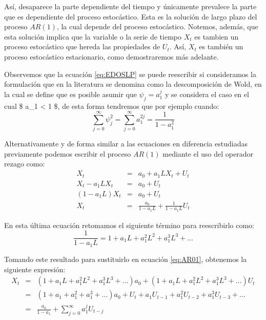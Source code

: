 \documentclass[
]{book}
\begin{document}
Así, desaparece la parte dependiente del tiempo y únicamente prevalece la parte que es dependiente del proceso estocástico. Esta es la solución de largo plazo del proceso \(AR(1)\), la cual depende del proceso estocástico. Notemos, además, que esta solución implica que la variable o la serie de tiempo \(X_t\) es tambien un proceso estocástico que hereda las propiedades de \(U_t\). Así, \(X_t\) es también un proceso estocástico estacionario, como demostraremos más adelante.

Observemos que la ecuación \eqref{eq:EDOSLP} se puede reescribir si consideramos la formulación que en la literatura se denomina como la descomposición de Wold, en la cual se define que es posible asumir que \(\psi_j = a_1^j\) y se considera el caso en el cual \$ \textbar a\_1\textbar{} \textless{} 1 \$, de esta forma tendremos que por ejemplo cuando:
\begin{equation*}
    \sum^{\infty}_{j = 0} \psi^2_j = \sum^{\infty}_{j = 0} a_1^{2j} = \frac{1}{1 - a_1^2} 
\end{equation*}

Alternativamente y de forma similar a las ecuaciones en diferencia estudiadas previamente podemos escribir el proceso \(AR(1)\) mediante el uso del operador rezago como:
\begin{eqnarray}
    X_t & = & a_0 + a_1 L X_t + U_t \nonumber \\
    X_t - a_1 L X_t & = & a_0 + U_t \nonumber \\
    (1 - a_1 L) X_t & = & a_0 + U_t \nonumber \\
    X_t & = & \frac{a_0}{1 - a_1 L} + \frac{1}{1 - a_1 L} U_t
    \label{eq:AR01}
\end{eqnarray}

En esta última ecuación retomamos el siguiente término para reescribirlo como:
\begin{equation}
    \frac{1}{1 - a_1 L} = 1 + a_1 L + a_1^2 L^2 + a_1^3 L^3 + \ldots 
\end{equation}

Tomando este resultado para sustituirlo en ecuación \eqref{eq:AR01}, obtenemos la siguiente expresión:
\begin{eqnarray}
    X_t & = & (1 + a_1 L + a_1^2 L^2 + a_1^3 L^3 + \ldots) a_0 + (1 + a_1 L + a_1^2 L^2 + a_1^3 L^3 + \ldots) U_t \nonumber \\
    & = & (1 + a_1 + a_1^2 + a_1^3 + \ldots) a_0 + U_t + a_1 U_{t-1} + a_1^2 U_{t-2} + a_1^3 U_{t-3} + \ldots \nonumber \\
    & = & \frac{a_0}{1 - a_1} + \sum^{\infty}_{j = 0} a_1^j U_{t-j}
    \label{eq:AR1Sol}
\end{eqnarray}
\end{document}
